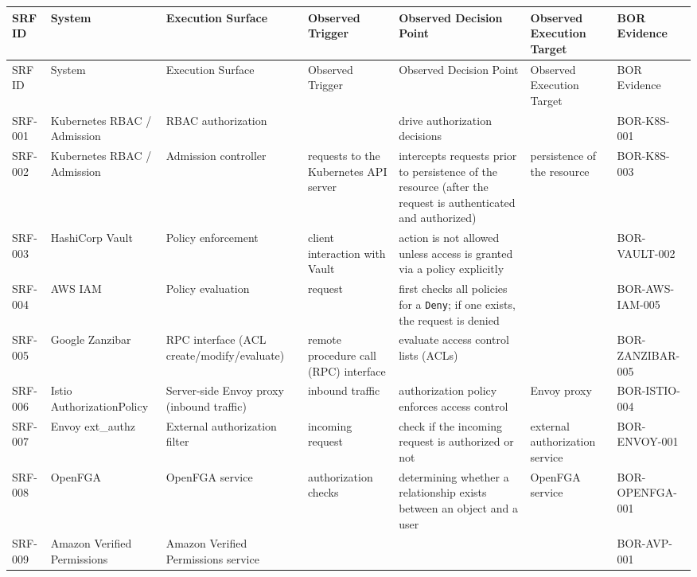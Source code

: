 \documentclass{article}
\begin{document}
\begin{longtable}{@{}p{}p{}p{}p{}p{}p{}p{}@{}}
\toprule
SRF ID & System & Execution Surface & Observed Trigger & Observed Decision Point & Observed Execution Target & BOR Evidence\\
\midrule
\endfirsthead
\toprule
SRF ID & System & Execution Surface & Observed Trigger & Observed Decision Point & Observed Execution Target & BOR Evidence\\
\midrule
\endhead
SRF-001 & Kubernetes RBAC / Admission & RBAC authorization &  & drive authorization decisions &  & BOR-K8S-001\\
SRF-002 & Kubernetes RBAC / Admission & Admission controller & requests to the Kubernetes API server & intercepts requests prior to persistence of the resource (after the request is authenticated and authorized) & persistence of the resource & BOR-K8S-003\\
SRF-003 & HashiCorp Vault & Policy enforcement & client interaction with Vault & action is not allowed unless access is granted via a policy explicitly &  & BOR-VAULT-002\\
SRF-004 & AWS IAM & Policy evaluation & request & first checks all policies for a \texttt{Deny}; if one exists, the request is denied &  & BOR-AWS-IAM-005\\
SRF-005 & Google Zanzibar & RPC interface (ACL create/modify/evaluate) & remote procedure call (RPC) interface & evaluate access control lists (ACLs) &  & BOR-ZANZIBAR-005\\
SRF-006 & Istio AuthorizationPolicy & Server-side Envoy proxy (inbound traffic) & inbound traffic & authorization policy enforces access control & Envoy proxy & BOR-ISTIO-004\\
SRF-007 & Envoy ext\_authz & External authorization filter & incoming request & check if the incoming request is authorized or not & external authorization service & BOR-ENVOY-001\\
SRF-008 & OpenFGA & OpenFGA service & authorization checks & determining whether a relationship exists between an object and a user & OpenFGA service & BOR-OPENFGA-001\\
SRF-009 & Amazon Verified Permissions & Amazon Verified Permissions service &  &  &  & BOR-AVP-001\\
\bottomrule
\end{longtable}
\end{document}
